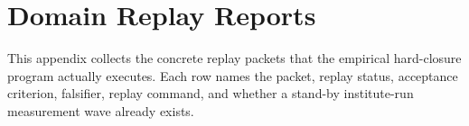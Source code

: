 \section{Domain Replay Reports}

This appendix collects the concrete replay packets that the empirical hard-closure program actually executes. Each row names the packet, replay status, acceptance criterion, falsifier, replay command, and whether a stand-by institute-run measurement wave already exists.

